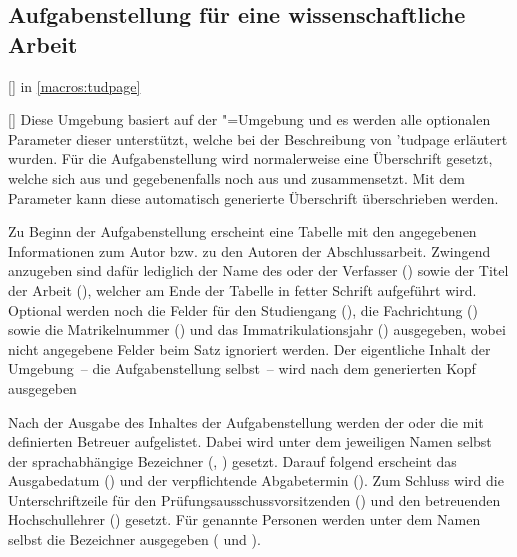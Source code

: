 \documentclass[%
  english,ngerman,%
  headings=optiontoheadandtoc,captions=tableheading,numbers=noenddot,%
  chapterpage,cdfoot,%
]{tudscrman}
\begin{document}
\subsection{Aufgabenstellung für eine wissenschaftliche Arbeit}
\begin{Declaration}{[]}{%
   in \autoref{macros:tudpage}
}
\begin{Declaration}{[]}
\printdeclarationlist%
%
Diese Umgebung basiert auf der "=Umgebung und es werden 
alle optionalen Parameter dieser unterstützt, welche bei der Beschreibung von 
\Environment'{tudpage} erläutert wurden. Für die Aufgabenstellung wird  
normalerweise eine Überschrift gesetzt, welche sich aus  und 
gegebenenfalls noch aus  und  zusammensetzt. Mit 
dem Parameter  kann diese automatisch 
generierte Überschrift überschrieben werden.

Zu Beginn der Aufgabenstellung erscheint eine Tabelle mit den angegebenen 
Informationen zum Autor bzw. zu den Autoren der Abschlussarbeit. Zwingend 
anzugeben sind dafür lediglich der Name des oder der Verfasser () 
sowie der Titel der Arbeit (), welcher am Ende der Tabelle in 
fetter Schrift aufgeführt wird. Optional werden noch die Felder für den 
Studiengang (), die Fachrichtung () sowie die 
Matrikelnummer () und das Immatrikulationsjahr 
() ausgegeben, wobei nicht angegebene Felder beim Satz 
ignoriert werden. Der eigentliche Inhalt der Umgebung~-- die Aufgabenstellung 
selbst~-- wird nach dem generierten Kopf ausgegeben

Nach der Ausgabe des Inhaltes der Aufgabenstellung werden der oder die mit 
 definierten Betreuer aufgelistet. Dabei wird unter dem 
jeweiligen Namen selbst der sprachabhängige Bezeichner (, 
) gesetzt. Darauf folgend erscheint das Ausgabedatum 
() und der verpflichtende Abgabetermin (). Zum 
Schluss wird die Unterschriftzeile für den Prüfungsausschussvorsitzenden 
() und den betreuenden Hochschullehrer () 
gesetzt. Für genannte Personen werden unter dem Namen selbst die Bezeichner 
ausgegeben ( und ).
\end{Declaration}
\end{Declaration}
\end{document}
